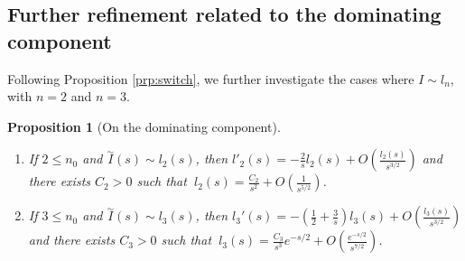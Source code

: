 \documentclass[11pt,a4paper]{article}
\newcommand{\1}{\mathbbm{1}}
\numberwithin{equation}{section}
\newtheorem{prp}[lemma]{Proposition}
\theoremstyle{remark}
\begin{document}
\subsection{Further refinement related to the dominating component}
Following Proposition \ref{prp:switch}, we further investigate the cases where $I \sim l_n$, with  $n=2$ and $n=3$.
\begin{prp}[On the dominating component]\label{prp:l_2,l_3}
$ $
\begin{enumerate}[label=(\roman*)]
\item If  $2\leq n_0$ and $\overset{\sim}{I}(s)\sim l_2(s)$, then $l'_2(s)=-\frac{2}{s}l_2(s)+O\left(\frac{l_2(s)}{s^{3/2}}\right)$ and there exists $C_2>0$ such that $\ l_2(s)=\frac{C_2}{s^2}+O\left(\frac{1}{s^{5/2}}\right)$.\label{item 1}
\item If $3\leq n_0$ and $\overset{\sim}{I}(s)\sim l_3(s)$, then $l_3'(s)=-\left(\frac{1}{2}+\frac{3}{s}\right)l_3(s)+O\left(\frac{l_3(s)}{s^{3/2}}\right)$ and there exists $C_3>0$ such that $\ l_3(s)=\frac{C_3}{s^3}e^{-s/2}+O\left(\frac{e^{-s/2}}{s^{7/2}}\right)$.\label{item 2}
\end{enumerate}
\end{prp}
\end{document}
